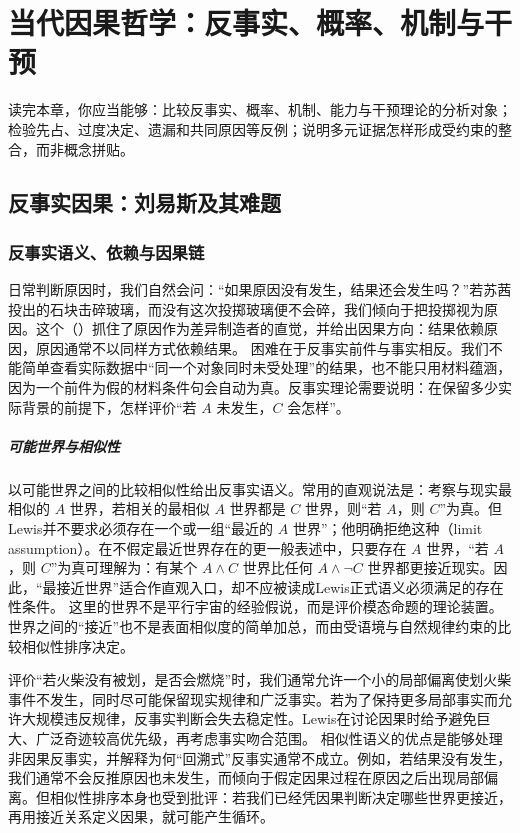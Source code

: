 \chapter{当代因果哲学：反事实、概率、机制与干预}
\label{ch:philosophies}

\begin{learninggoals}
读完本章，你应当能够：比较反事实、概率、机制、能力与干预理论的分析对象；检验先占、过度决定、遗漏和共同原因等反例；说明多元证据怎样形成受约束的整合，而非概念拼贴。
\end{learninggoals}

\section{反事实因果：刘易斯及其难题}

\subsection{反事实语义、依赖与因果链}

日常判断原因时，我们自然会问：“如果原因没有发生，结果还会发生吗？”若苏茜投出的石块击碎玻璃，而没有这次投掷玻璃便不会碎，我们倾向于把投掷视为原因。这个（）抓住了原因作为差异制造者的直觉，并给出因果方向：结果依赖原因，原因通常不以同样方式依赖结果。
困难在于反事实前件与事实相反。我们不能简单查看实际数据中“同一个对象同时未受处理”的结果，也不能只用材料蕴涵，因为一个前件为假的材料条件句会自动为真。反事实理论需要说明：在保留多少实际背景的前提下，怎样评价“若 $A$ 未发生，$C$ 会怎样”。

\paragraph{可能世界与相似性}

\textcite{lewisCounterfactuals}以可能世界之间的比较相似性给出反事实语义。常用的直观说法是：考察与现实最相似的 $A$ 世界，若相关的最相似 $A$ 世界都是 $C$ 世界，则“若 $A$，则 $C$”为真。但Lewis并不要求必须存在一个或一组“最近的 $A$ 世界”；他明确拒绝这种（limit assumption）。在不假定最近世界存在的更一般表述中，只要存在 $A$ 世界，“若 $A$，则 $C$”为真可理解为：有某个 $A\land C$ 世界比任何 $A\land\neg C$ 世界都更接近现实。因此，“最接近世界”适合作直观入口，却不应被读成Lewis正式语义必须满足的存在性条件。
这里的世界不是平行宇宙的经验假说，而是评价模态命题的理论装置。世界之间的“接近”也不是表面相似度的简单加总，而由受语境与自然规律约束的比较相似性排序决定。

评价“若火柴没有被划，是否会燃烧”时，我们通常允许一个小的局部偏离使划火柴事件不发生，同时尽可能保留现实规律和广泛事实。若为了保持更多局部事实而允许大规模违反规律，反事实判断会失去稳定性。Lewis在讨论因果时给予避免巨大、广泛奇迹较高优先级，再考虑事实吻合范围。
相似性语义的优点是能够处理非因果反事实，并解释为何“回溯式”反事实通常不成立。例如，若结果没有发生，我们通常不会反推原因也未发生，而倾向于假定因果过程在原因之后出现局部偏离。但相似性排序本身也受到批评：若我们已经凭因果判断决定哪些世界更接近，再用接近关系定义因果，就可能产生循环。

